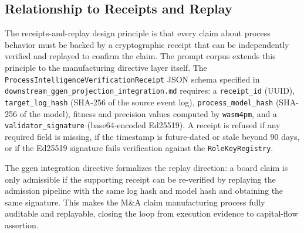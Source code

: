 \subsection{Relationship to Receipts and Replay}
\label{sec:prompts-lineage-receipts}

The receipts-and-replay design principle is that every claim about process behavior
must be backed by a cryptographic receipt that can be independently verified and
replayed to confirm the claim. The prompt corpus extends this principle to the
manufacturing directive layer itself. The \texttt{ProcessIntelligenceVerificationReceipt}
JSON schema specified in \texttt{downstream\_ggen\_projection\_integration.md}
requires: a \texttt{receipt\_id} (UUID), \texttt{target\_log\_hash} (SHA-256 of the
source event log), \texttt{process\_model\_hash} (SHA-256 of the model), fitness and
precision values computed by \texttt{wasm4pm}, and a \texttt{validator\_signature}
(base64-encoded Ed25519). A receipt is refused if any required field is missing, if
the timestamp is future-dated or stale beyond 90 days, or if the Ed25519 signature
fails verification against the \texttt{RoleKeyRegistry}.

The ggen integration directive formalizes the replay direction: a board claim is only
admissible if the supporting receipt can be re-verified by replaying the admission
pipeline with the same log hash and model hash and obtaining the same signature. This
makes the M\&A claim manufacturing process fully auditable and replayable, closing
the loop from execution evidence to capital-flow assertion.
